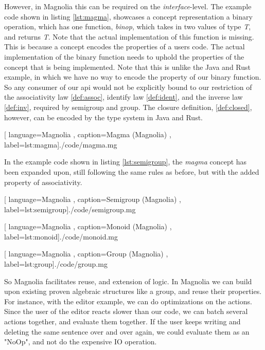However, in Magnolia this can be required on the \textit{interface}-level. The
example code shown in listing \ref{lst:magma}, showcases a concept
representation a binary operation, which has one function, \textit{binop}, which
takes in two values of type \textit{T}, and returns \textit{T}. Note that the
actual implementation of this function is missing. This is because a concept
encodes the properties of a users code. The actual implementation of the
binary function needs to uphold the properties of the concept that is
being implemented. Note that this is unlike the Java and Rust example, in
which we have no way to encode the property of our binary function. So any
consumer of our \gls{api} would not be explicitly bound to our restriction of
the associativity law \ref{def:assoc}, identify law \ref{def:ident}, and the
inverse law \ref{def:inv}, required by semigroup and group. The closure
definition, \ref{def:closed}, however, can be encoded by the type system in Java
and Rust.

\begin{center}
  
    [ language=Magnolia
    , caption={Magma (Magnolia)}
    , label=lst:magma]{./code/magma.mg}
\end{center}

In the example code shown in listing \ref{lst:semigroup}, the \textit{magma}
concept has been expanded upon, still following the same rules as before, but
with the added property of associativity.

\begin{center}
  
    [ language=Magnolia
    , caption={Semigroup (Magnolia)}
    , label=lst:semigroup]{./code/semigroup.mg}
\end{center}

\begin{center}
  
    [ language=Magnolia
    , caption={Monoid (Magnolia)}
    , label=lst:monoid]{./code/monoid.mg}
\end{center}

\begin{center}
  
    [ language=Magnolia
    , caption={Group (Magnolia)}
    , label=lst:group]{./code/group.mg}
\end{center}

So Magnolia facilitates reuse, and extension of logic. In Magnolia we can build
upon existing proven algebraic structures like a group, and reuse their
properties. For instance, with the editor example, we can do optimizations on
the actions. Since the user of the editor reacts slower than our code, we can
batch several actions together, and evaluate them together. If the user keeps
writing and deleting the same sentence over and over again, we could evaluate
them as an "NoOp", and not do the expensive IO operation.

